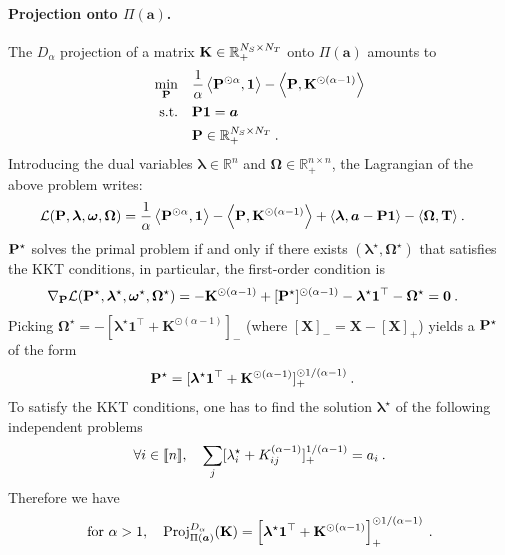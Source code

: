     \paragraph{Projection onto $\Pi(\bm{a})$.} The $D_\alpha$ projection of a matrix ${\mathbf{K}} \in \mathbb{R}_+^{N_S \times N_T}$ onto $\Pi(\bm{a})$ amounts to
    \begin{align}
        \min_{{\mathbf{P}}} \quad &\frac{1}{\alpha} \left\langle {\mathbf{P}}^{\odot \alpha}, \bm{1} \right\rangle - \left\langle {\mathbf{P}}, {\mathbf{K}}^{\odot (\alpha-1)} \right\rangle \\
        \text{s.t.} \quad &{\mathbf{P}} \bm{1} = \bm{a} \\
        & {\mathbf{P}} \in \mathbb{R}_+^{N_S \times N_T} \:.
    \end{align}
    Introducing the dual variables $\bm{\lambda} \in \mathbb{R}^n$ and $\bm{\Omega} \in \mathbb{R}_+^{n \times n}$, the Lagrangian of the above problem writes:
    \begin{align}
        \mathcal{L}({\mathbf{P}}, \bm{\lambda}, \bm{\omega}, \bm{\Omega}) &=  \frac{1}{\alpha} \left\langle {\mathbf{P}}^{\odot \alpha}, \bm{1} \right\rangle - \left\langle {\mathbf{P}}, {\mathbf{K}}^{\odot (\alpha-1)} \right\rangle + \langle \bm{\lambda}, \bm{a} - {\mathbf{P}} \bm{1} \rangle - \langle \bm{\Omega}, {\mathbf{T}} \rangle \:.
    \end{align}
    ${\mathbf{P}}^\star$ solves the primal problem if and only if there exists $(\bm{\lambda}^\star, \bm{\Omega}^\star)$ that satisfies the KKT conditions, in particular, the first-order condition is
    \begin{align}
        \nabla_{{\mathbf{P}}} \mathcal{L} ({\mathbf{P}}^\star, \bm{\lambda}^\star, \bm{\omega}^\star, \bm{\Omega}^\star) &= - \mathbf{K}^{\odot(\alpha-1)} + [{\mathbf{P}}^\star]^{\odot (\alpha - 1)} - \bm{\lambda}^\star \bm{1}^\top - \bm{\Omega}^\star = \bm{0} \:.
    \end{align}
    Picking $\bm{\Omega}^\star = -[\bm{\lambda}^\star \bm{1}^\top + \mathbf{K}^{\odot(\alpha-1)}]_{-}$ (where $[\mathbf{X}]_{-} = \mathbf{X} - [\mathbf{X}]_{+}$) yields a ${\mathbf{P}}^\star$ of the form
    \begin{align}
        {\mathbf{P}}^\star &= [\bm{\lambda}^\star \bm{1}^\top + \mathbf{K}^{\odot(\alpha-1)}]_+^{\odot 1/(\alpha-1)} \:.
    \end{align}
    To satisfy the KKT conditions, one has to find the solution $\bm{\lambda}^\star$ of the following independent problems 
    \begin{align}
        \forall i \in {[\![n]\!]}, \quad \sum_j [\lambda^\star_i + K_{ij}^{(\alpha-1)}]_+^{1/(\alpha-1)} =  a_i \:.
    \end{align}
Therefore we have
    \begin{align}
        \text{for } \alpha>1, \quad \operatorname{Proj}^{D_{\alpha}}_{\Pi(\bm{a})}({\mathbf{K}}) = \left[\bm{\lambda}^\star \bm{1}^\top + {\mathbf{K}}^{\odot(\alpha-1)}\right]_+^{\odot 1/(\alpha-1)} \:.
    \end{align}

